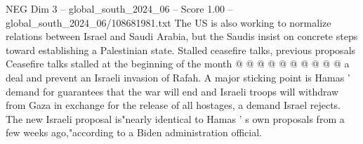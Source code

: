 \begin{textsample}{NEG Dim 3 – global\_south\_2024\_06 – Score 1.00 – global\_south\_2024\_06/108681981.txt}
The US is also working to normalize relations between Israel and Saudi Arabia, but the Saudis insist on concrete steps toward establishing a Palestinian state.
Stalled ceasefire talks, previous proposals Ceasefire talks stalled at the beginning of the month @ @ @ @ @ @ @ @ @ @ a deal and prevent an Israeli invasion of Rafah.
A major sticking point is Hamas ' demand for guarantees that the war will end and Israeli troops will withdraw from Gaza in exchange for the release of all hostages, a demand Israel rejects.
The new Israeli proposal is"nearly identical to Hamas ' s own proposals from a few weeks ago,"according to a Biden administration official.

\end{textsample}
